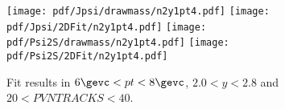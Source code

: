 \begin{figure}[H]
\begin{center}
\texttt{[image: pdf/Jpsi/drawmass/n2y1pt4.pdf]}
\texttt{[image: pdf/Jpsi/2DFit/n2y1pt4.pdf]}
\vspace*{-0.5cm}
\texttt{[image: pdf/Psi2S/drawmass/n2y1pt4.pdf]}
\texttt{[image: pdf/Psi2S/2DFit/n2y1pt4.pdf]}
\vspace*{-0.5cm}
\end{center}
\caption{Fit results in $6\gevc<pt<8\gevc$, $2.0<y<2.8$ and $20<PVNTRACKS<40$.}
\label{Fitn2y1pt4}
\end{figure}
